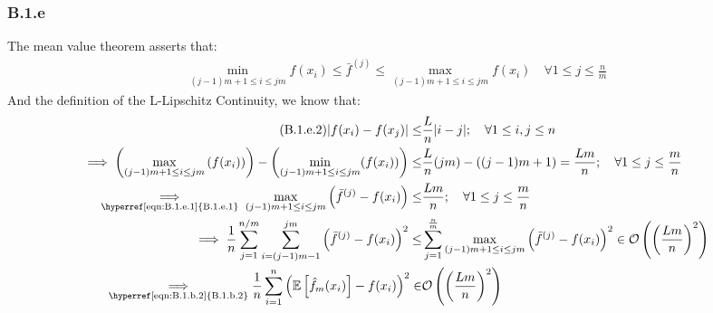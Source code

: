 \documentclass[]{article}
\begin{document}
    \subsubsection*{B.1.e}
        The mean value theorem asserts that: 
        \begin{align*}\tag{B.1.e.1}\label{eqn:B.1.e.1}
            \min_{(j - 1)m + 1\le i\le jm} f(x_i)\le 
            \bar{f}^{(j)}
            \le \max_{(j - 1)m +1\le i \le jm} f(x_i)
            \quad \forall 1 \le j \le \frac{n}{m}
        \end{align*}
        And the definition of the L-Lipschitz Continuity, we know that: 
        \begin{align*}\tag{B.1.e.2}\label{eqn:B.1.e.2}
            |f(x_i) - f(x_j)| \le& \frac{L}{n}|i - j| ;\quad \forall 1 \le i,j \le n
            \\
            \implies
            \left(
                \max_{(j - 1)m + 1\le i \le jm}
                \left(
                    f(x_i) 
                \right)
            \right)
            - 
            \left(
                \min_{(j - 1)m + 1\le i \le jm}
                (f(x_i))
            \right)
            \le& \frac{L}{n}(jm) - ((j-1)m + 1) = \frac{Lm}{n}
            ;\quad \forall 1 \le j \le \frac{m}{n}
            \\
            \underset{\text{
                \hyperref[eqn:B.1.e.1]{B.1.e.1}
            }}{\implies}
            \max_{(j-1)m + 1 \le i \le jm}
            \left(
                \bar{f}^{(j)} - f(x_i)
            \right)
            \le&
            \frac{Lm}{n} ;\quad\forall 1 \le j \le \frac{m}{n}
            \\
            \implies
            \frac{1}{n}\sum_{j = 1}^{n/m}\sum_{i = (j - 1)m - 1}^{jm}\left(
                \bar{f}^{(j)} - f(x_i)
            \right)^2
            \le&
            \sum_{j = 1}^{\frac{n}{m}}
            \max_{(j-1)m + 1 \le i \le jm}
            \left(
                \bar{f}^{(j)} - f(x_i)
            \right)^2
            \in
            \mathcal{O}
            \left(
                \left(
                    \frac{Lm}{n}
                \right)^2
            \right)
            \\
            \underset{
                \text{\hyperref[eqn:B.1.b.2]{B.1.b.2}}
                }
                {\implies}
            \frac{1}{n}\sum_{i = 1}^{n}\left(\mathbb{E}\left[\hat{f}_m(x_i)\right] - f(x_i)\right)^2
            \in&
            \mathcal{O}
            \left(
                \left(
                    \frac{Lm}{n}
                \right)^2
            \right)
        \end{align*}
\end{document}
